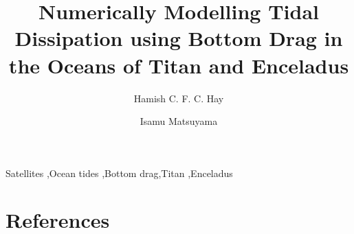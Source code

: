 \documentclass[review,times,authoryear]{elsarticle}
\begin{document}
\hypersetup{
     allcolors = MidnightBlue
}


\begin{frontmatter}

\title{Numerically Modelling Tidal Dissipation using Bottom Drag in the Oceans of Titan and Enceladus}

\author[label1]{Hamish C. F. C. Hay}
\author[label1]{Isamu Matsuyama}
\address[label1]{Lunar and Planetary Laboratory, University of Arizona, Tucson, AZ 85719, United States}


\begin{keyword}
Satellites \sep Ocean tides \sep Bottom drag\sep Titan \sep Enceladus 
\end{keyword}

\begin{abstract}



\end{abstract}
\end{frontmatter}








%



\section*{References}


%
\end{document}
